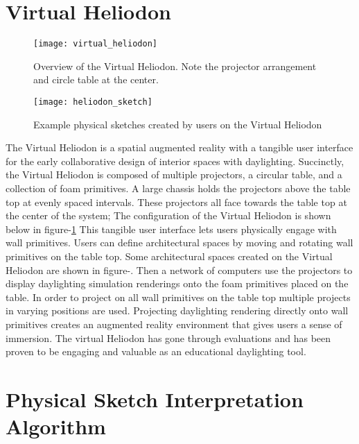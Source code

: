 \section{Virtual Heliodon}

	\begin{figure}[h]
	\centering
	\texttt{[image: virtual\_heliodon]}
	\label{fig:virtual_heliodon}
	\caption{Overview of the Virtual Heliodon. Note the projector arrangement and circle table at the center.}
	\end{figure}

	\begin{figure}[h]
	\centering
	\texttt{[image: heliodon\_sketch]}
	\label{fig:heliodon_sketch}
	\caption{Example physical sketches created by users on the Virtual Heliodon}
	\end{figure}

	The Virtual Heliodon is a spatial augmented reality with a tangible user interface for the early collaborative design of interior spaces with daylighting\cite{sheng2009virtual, cutler2009inferring,nasman2013physical,nasman2013evaluation,cutler2010interpreting}. 
	Succinctly, the Virtual Heliodon is composed of multiple projectors, a circular table, and a collection of foam primitives.  
	A large chassis holds the projectors above the table top at evenly spaced intervals. 
	These projectors all face towards the table top at the center of the system;
	The configuration of the Virtual Heliodon is shown below in figure-\ref{fig:virtual_heliodon}
	This tangible user interface lets users physically engage with wall primitives. 
	Users can define architectural spaces by moving and rotating wall primitives on the table top.
	Some architectural spaces created on the Virtual Heliodon are shown in figure-\cite{fig:heliodon_sketch}.
	Then a network of computers use the projectors to display daylighting simulation renderings onto the foam primitives placed on the table.
	In order to project on all wall primitives on the table top multiple projects in varying positions are used.
	Projecting daylighting rendering directly onto wall primitives creates an augmented reality environment that gives users a sense of immersion\cite{nasman2013evaluation}.
	The virtual Heliodon has gone through evaluations and has been proven to be engaging and valuable as an educational daylighting tool\cite{nasman2013evaluation}.

\section{Physical Sketch Interpretation Algorithm}

